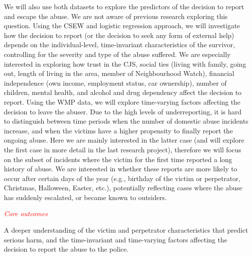 \documentclass[11pt, a4paper]{article}
\begin{document}
We will also use both datasets to explore the predictors of the decision to report and escape the abuse. We are not aware of previous research exploring this question. Using the CSEW and logistic regression approach, we will investigate how the decision to report (or the decision to seek any form of external help) depends on the individual-level, time-invariant characteristics of the survivor, controlling for the severity and type of the abuse suffered. We are especially interested in exploring how trust in the CJS, social ties (living with family, going out, length of living in the area, member of Neighbourhood Watch), financial independence (own income, employment status, car ownership), number of children, mental health, and alcohol and drug dependency affect the decision to report. Using the WMP data, we will explore time-varying factors affecting the decision to leave the abuser. Due to the high levels of underreporting, it is hard to distinguish between time periods when the number of domestic abuse incidents increase, and when the victims have a higher propensity to finally report the ongoing abuse. Here we are mainly interested in the latter case (and will explore the first case in more detail in the last research project), therefore we will focus on the subset of incidents where the victim for the first time reported a long history of abuse. We are interested in whether these reports are more likely to occur after certain days of the year (e.g., birthday of the victim or perpetrator, Christmas, Halloween, Easter, etc.), potentially reflecting cases where the abuse has suddenly escalated, or became known to outsiders.



\textcolor{red}{\textit{Core outcomes}}

A deeper understanding of the victim and perpetrator characteristics that predict serious harm, and the time-invariant and time-varying factors affecting the decision to report the abuse to the police. 

\FloatBarrier


\end{document}
